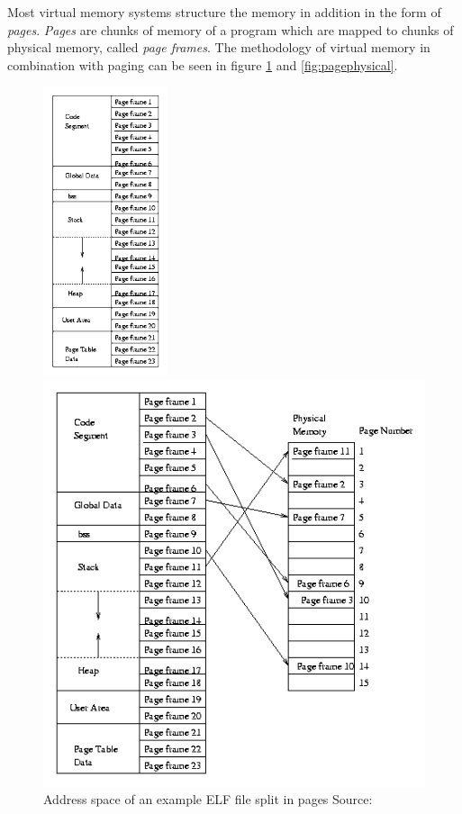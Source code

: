 Most virtual memory systems structure the memory in addition in the form of \textit{pages}. \textit{Pages} are chunks of memory of a program which are mapped to chunks of physical memory, called \textit{page frames}. \cite{virtual-memory} \cite[p. 195-196]{tanenbaum} The methodology of virtual memory in combination with paging can be seen in figure \ref{fig:singlepage} and \ref{fig:pagephysical}.

\begin{figure}[H]
     \centering
     \captionsetup{justification=raggedright}
     \begin{minipage}[b]{0.4\textwidth}
         \centering
         \hspace*{5mm}\includegraphics[height=8.5cm]{images/3_basics/pages-single.png}
         \caption{Address space of an example ELF file split in pages Source: \cite{pic:singlepage}}
         \label{fig:singlepage}
     \end{minipage}%
     \hspace*{7mm}
     \begin{minipage}[b]{0.6\textwidth}
         \centering
         \includegraphics[width=.85\textwidth]{images/3_basics/pages-with-physical.png}

\end{minipage}
\end{figure}

